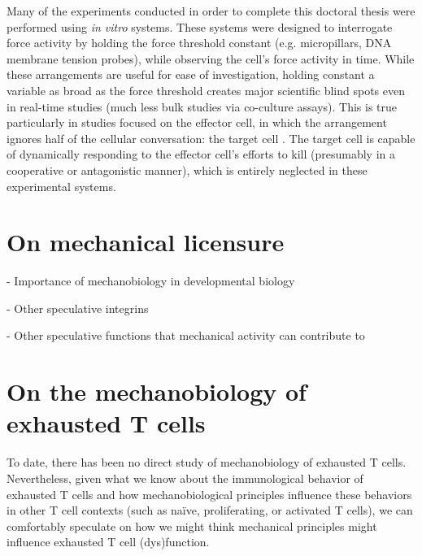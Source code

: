 Many of the experiments conducted in order to complete this doctoral thesis were performed using \textit{in vitro} systems. These systems were designed to interrogate force activity by holding the force threshold constant (e.g. micropillars, DNA membrane tension probes), while observing the cell's force activity in time. While these arrangements are useful for ease of investigation, holding constant a variable as broad as the force threshold creates major scientific blind spots even in real-time studies (much less bulk studies via co-culture assays). This is true particularly in studies focused on the effector cell, in which the arrangement ignores half of the cellular conversation: the target cell \cite{Tello-lafoz2021}. The target cell is capable of dynamically responding to the effector cell's efforts to kill (presumably in a cooperative or antagonistic manner), which is entirely neglected in these experimental systems. 

\section{On mechanical licensure}

- Importance of mechanobiology in developmental biology

- Other speculative integrins

- Other speculative functions that mechanical activity can contribute to

\section{On the mechanobiology of exhausted T cells}

To date, there has been no direct study of mechanobiology of exhausted T cells. Nevertheless, given what we know about the immunological behavior of exhausted T cells and how mechanobiological principles influence these behaviors in other T cell contexts (such as na{\"i}ve, proliferating, or activated T cells), we can comfortably speculate on how we might think mechanical principles might influence exhausted T cell (dys)function.

